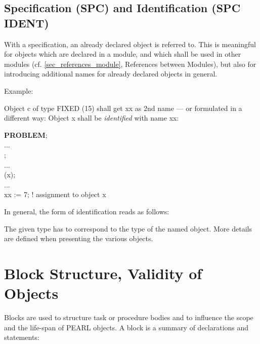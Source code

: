 \subsection{Specification (SPC) and Identification (SPC IDENT)}  %

With a specification, an already declared object is
referred to.  This is meaningful for objects which are declared in a
module, and which shall be used in other modules (cf. \ref{sec_references_module},
 References
between Modules), but also for introducing additional names for already
declared objects in general.

Example:

Object c of type FIXED (15) shall get xx as 2nd name --- or formulated
in a different way: Object x shall be {\it identified} with name xx:

{\bf PROBLEM};\\
\x ...\\
;\\
\x ...\\
 (x);\\
\x ...\\
\x xx := 7; \x ! assignment to object x

In general, the form of identification reads as follows:






The given type has to correspond to the type of the named object. More
details are defined when presenting the various objects.

\section{Block Structure, Validity of Objects}   %
\label{sec_block}

Blocks are used to structure task or procedure bodies and to influence
the scope and the life-span of PEARL objects. A block is a summary of
declarations and statements:

